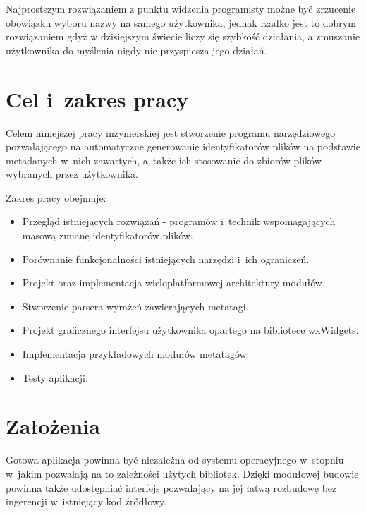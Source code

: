 Najprostszym rozwiązaniem z punktu widzenia programisty możne być zrzucenie obowiązku wyboru nazwy na samego użytkownika, jednak rzadko jest to dobrym rozwiązaniem gdyż w dzisiejszym świecie liczy się szybkość działania, a zmuszanie użytkownika do myślenia nigdy nie przyspiesza jego działań.


\section{Cel i~zakres pracy}
\par
Celem niniejszej pracy inżynierskiej jest stworzenie programu narzędziowego pozwalającego na automatyczne generowanie identyfikatorów plików na podstawie metadanych w~nich zawartych, a~także ich stosowanie do zbiorów plików wybranych przez użytkownika.

\par
Zakres pracy obejmuje:
\begin{itemize}
\item Przegląd istniejących rozwiązań - programów i~technik wspomagających masową zmianę identyfikatorów plików.
\item Porównanie funkcjonalności istniejących narzędzi i~ich ograniczeń.
\item Projekt oraz implementacja wieloplatformowej architektury modułów.
\item Stworzenie parsera wyrażeń zawierających metatagi.
\item Projekt graficznego interfejsu użytkownika opartego na bibliotece wxWidgets.
\item Implementacja przykładowych modułów metatagów.
\item Testy aplikacji.
\end{itemize}

\section{Założenia}
\label{zalozenia}
Gotowa aplikacja powinna być niezależna od systemu operacyjnego w~stopniu w~jakim pozwalają na to zależności użytych bibliotek. Dzięki modułowej budowie powinna także udostępniać interfejs pozwalający na jej łatwą rozbudowę bez ingerencji w~istniejący kod źródłowy.

